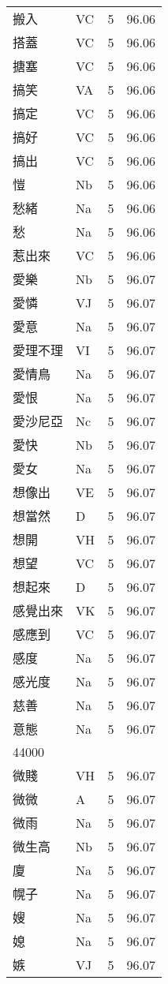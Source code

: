 \documentclass[twocolumn]{book}
\begin{document}
\begin{supertabular}{llrr}
搬入 & VC & 5 &  96.06\\
搭蓋 & VC & 5 &  96.06\\
搪塞 & VC & 5 &  96.06\\
搞笑 & VA & 5 &  96.06\\
搞定 & VC & 5 &  96.06\\
搞好 & VC & 5 &  96.06\\
搞出 & VC & 5 &  96.06\\
愷 & Nb & 5 &  96.06\\
愁緒 & Na & 5 &  96.06\\
愁 & Na & 5 &  96.06\\
惹出來 & VC & 5 &  96.06\\
愛樂 & Nb & 5 &  96.07\\
愛憐 & VJ & 5 &  96.07\\
愛意 & Na & 5 &  96.07\\
愛理不理 & VI & 5 &  96.07\\
愛情鳥 & Na & 5 &  96.07\\
愛恨 & Na & 5 &  96.07\\
愛沙尼亞 & Nc & 5 &  96.07\\
愛快 & Nb & 5 &  96.07\\
愛女 & Na & 5 &  96.07\\
想像出 & VE & 5 &  96.07\\
想當然 & D & 5 &  96.07\\
想開 & VH & 5 &  96.07\\
想望 & VC & 5 &  96.07\\
想起來 & D & 5 &  96.07\\
感覺出來 & VK & 5 &  96.07\\
感應到 & VC & 5 &  96.07\\
感度 & Na & 5 &  96.07\\
感光度 & Na & 5 &  96.07\\
慈善 & Na & 5 &  96.07\\
意態 & Na & 5 &  96.07\\
44000\\
微賤 & VH & 5 &  96.07\\
微微 & A & 5 &  96.07\\
微雨 & Na & 5 &  96.07\\
微生高 & Nb & 5 &  96.07\\
廈 & Na & 5 &  96.07\\
幌子 & Na & 5 &  96.07\\
嫂 & Na & 5 &  96.07\\
媳 & Na & 5 &  96.07\\
嫉 & VJ & 5 &  96.07\\

\end{supertabular}
\end{document}
